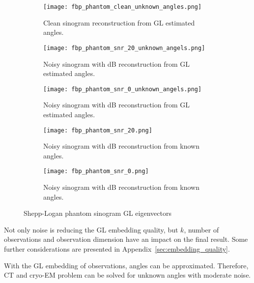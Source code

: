 \begin{figure}[H]
    \captionsetup[subfigure]{justification=centering}
    \centering
    \begin{subfigure}[t]{0.3\textwidth}
        \texttt{[image: fbp\_phantom\_clean\_unknown\_angles.png]}
        \caption{Clean sinogram reconstruction from GL estimated angles.}
        \label{fig:clean_reco_unknown}
    \end{subfigure}\hfill
    \begin{subfigure}[t]{0.3\textwidth}
      \texttt{[image: fbp\_phantom\_snr\_20\_unknown\_angels.png]}
      \caption{Noisy sinogram with  dB reconstruction from GL estimated angles.}
      \label{fig:noisy_snr20_reco_unknown}
    \end{subfigure}\hfill
    \begin{subfigure}[t]{0.3\textwidth}
      \texttt{[image: fbp\_phantom\_snr\_0\_unknown\_angels.png]}
      \caption{Noisy sinogram with  dB reconstruction from GL estimated angles.}
      \label{fig:noisy_snr0_reco_unknown}
    \end{subfigure}

    \begin{subfigure}[t]{0.3\textwidth}
      \texttt{[image: fbp\_phantom\_snr\_20.png]}
      \caption{Noisy sinogram with  dB reconstruction from known angles.}
      \label{fig:noisy_snr20_reco_known}
    \end{subfigure}\hfill
    \begin{subfigure}[t]{0.3\textwidth}
      \texttt{[image: fbp\_phantom\_snr\_0.png]}
      \caption{Noisy sinogram with  dB reconstruction from known angles.}
      \label{fig:noisy_snr0_reco_known}
    \end{subfigure}

    \caption{Shepp-Logan phantom sinogram GL eigenvectors}
    \label{fig:phantom_fbp_unknown_angles}
  \end{figure}

  Not only noise is reducing the GL embedding quality, but $k$, number of observations 
  and observation dimension have an impact on the final result.
  Some further considerations are presented in Appendix~\ref{sec:embedding_quality}.

  \begin{tcolorbox}[colback=red!5!white,colframe=red!75!black]
    With the GL embedding of observations, angles can be approximated.
    Therefore, CT and cryo-EM problem can be solved for unknown angles with moderate noise.
  \end{tcolorbox}

